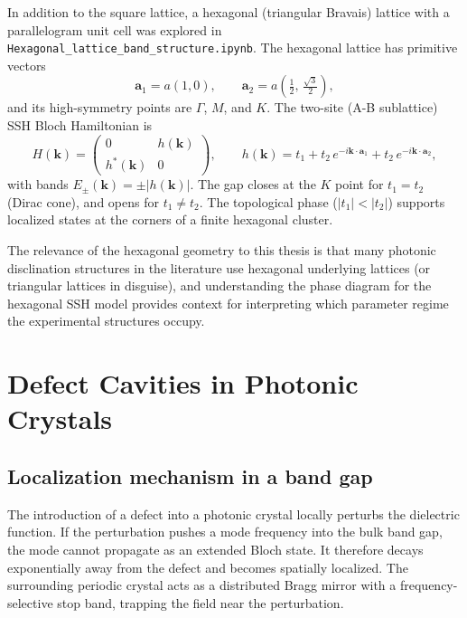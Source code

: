 \documentclass[12pt,a4paper,oneside]{book}
\theoremstyle{plain}
\theoremstyle{definition}
\theoremstyle{remark}
\newcommand{\vb}[1]{\bm{#1}}
\newcommand{\kvec}{\vb{k}}
\begin{document}
In addition to the square lattice, a hexagonal (triangular Bravais) lattice with a parallelogram unit cell was explored in \texttt{Hexagonal\_lattice\_band\_structure.ipynb}. The hexagonal lattice has primitive vectors
\begin{equation}
  \vb{a}_1 = a(1, 0), \qquad \vb{a}_2 = a\left(\tfrac{1}{2},\, \tfrac{\sqrt{3}}{2}\right),
\end{equation}
and its high-symmetry points are $\Gamma$, $M$, and $K$. The two-site (A-B sublattice) SSH Bloch Hamiltonian is
\begin{equation}
  H(\kvec) = \begin{pmatrix} 0 & h(\kvec) \\ h^*(\kvec) & 0 \end{pmatrix},
  \qquad h(\kvec) = t_1 + t_2\,e^{-i\kvec\cdot\vb{a}_1} + t_2\,e^{-i\kvec\cdot\vb{a}_2},
\end{equation}
with bands $E_\pm(\kvec) = \pm|h(\kvec)|$. The gap closes at the $K$ point for $t_1 = t_2$ (Dirac cone), and opens for $t_1 \neq t_2$. The topological phase ($|t_1| < |t_2|$) supports localized states at the corners of a finite hexagonal cluster.

The relevance of the hexagonal geometry to this thesis is that many photonic disclination structures in the literature use hexagonal underlying lattices (or triangular lattices in disguise), and understanding the phase diagram for the hexagonal SSH model provides context for interpreting which parameter regime the experimental structures occupy.

\chapter{Defect Cavities in Photonic Crystals}
\label{chap:defect-cavities}

\section{Localization mechanism in a band gap}
\label{sec:localization-mechanism}

The introduction of a defect into a photonic crystal locally perturbs the dielectric function. If the perturbation pushes a mode frequency into the bulk band gap, the mode cannot propagate as an extended Bloch state. It therefore decays exponentially away from the defect and becomes spatially localized. The surrounding periodic crystal acts as a distributed Bragg mirror with a frequency-selective stop band, trapping the field near the perturbation.
\end{document}
